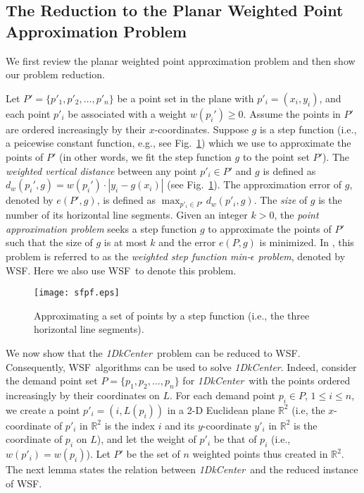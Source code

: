 \documentclass{llncs}
\def\calR{\mathbb{R}^2}
\def\wsf{WSF}
\def\problem{{\it 1DkCenter}}
\begin{document}
\subsection{The Reduction to the Planar Weighted Point Approximation Problem}
\label{sec:reduction}

We first review the planar weighted point approximation problem
and then show our problem reduction.

Let $P'=\{p'_1, p'_2, \ldots, p'_n\}$ be a point set in the plane
with $p'_i=(x_i,y_i)$, and each point $p'_i$ be associated with a
weight $w(p_i')\geq 0$. Assume the points in $P'$ are ordered
increasingly by their $x$-coordinates. Suppose $g$ is a step
function (i.e., a peicewise constant function, e.g., see Fig.~\ref{fig:sfpf})
which we use to approximate the points of $P'$ (in other
words, we fit the step function $g$ to the point set $P'$). The {\em
weighted vertical distance} between any point $p'_i\in P'$ and $g$ is
defined as $d_w(p_i',g)=w(p_i')\cdot |y_i-g(x_i)|$ (see
Fig.~\ref{fig:sfpf}). The approximation error of $g$, denoted by
$e(P',g)$, is defined as $\max_{p'_i\in P'} d_w(p'_i,g)$. The {\em
size} of $g$ is the number of its horizontal line segments. Given an
integer $k>0$, the {\em point approximation problem} seeks a step
function $g$ to approximate the points of $P'$ such that the size of
$g$ is at most $k$ and the error $e(P,g)$ is minimized. In
\cite{ref:ChenAp091}, this problem is referred to as the {\em
weighted step function min-$\epsilon$ problem}, denoted by \wsf.
Here we also use \wsf\ to denote this problem.

\begin{figure}[t]
\begin{minipage}[t]{\linewidth}
\begin{center}
\texttt{[image: sfpf.eps]}
\caption{\footnotesize Approximating a set of points by a step function
(i.e., the three horizontal line segments).}
\label{fig:sfpf}
\end{center}
\end{minipage}
\vspace*{-0.15in}
\end{figure}


We now show that the \problem\ problem can be reduced to \wsf.
Consequently, \wsf\ algorithms can be used to solve \problem.
Indeed, consider the demand point set $P=\{p_1,p_2,\ldots,p_n\}$ for
\problem\ with the points ordered increasingly
by their coordinates on $L$. For each demand point $p_i\in P$,
$1\leq i\leq n$, we create a point $p'_i=(i,L(p_i))$ in a 2-D
Euclidean plane $\calR$
(i.e, the $x$-coordinate of $p'_i$ in $\calR$ is the index $i$ and
its $y$-coordinate $y'_i$ in $\calR$ is the coordinate of $p_i$ on
$L$), and let the weight of $p'_i$ be that of $p_i$ (i.e.,
$w(p'_i)=w(p_i)$). Let $P'$ be the set of $n$ weighted points thus
created in $\calR$. The next lemma states the relation between
\problem\ and the reduced instance of \wsf.
\end{document}
